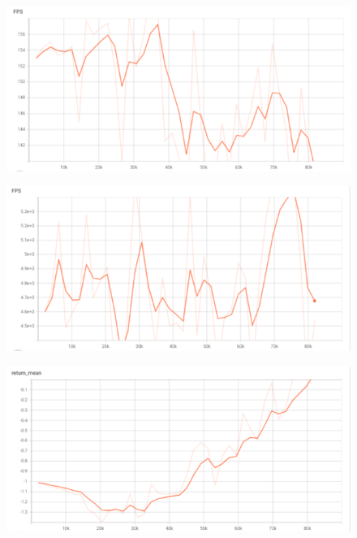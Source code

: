\begin{figure}
\begin{minipage}{.5\textwidth}
        \label{fig:policyrl}
      \end{minipage}
%
%
      \begin{minipage}{.5\textwidth}
        \centering
        \includegraphics[width=1\linewidth]{figures/diofps.png}
        \label{fig:fpsdio}
      \end{minipage}%
      \begin{minipage}{.5\textwidth}
        \centering
        \includegraphics[width=1\linewidth]{figures/rlfps.png}
        \label{fig:fpsrl}
      \end{minipage}
%
%
      \centering
      \begin{minipage}{.5\textwidth}
        \centering
        \includegraphics[width=1\linewidth]{figures/dioreturn.png}

\end{minipage}
\end{figure}
